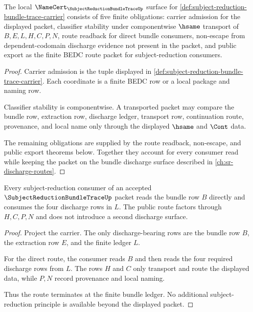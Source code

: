 \begin{theorem}
\label{thm:subject-reduction-bundle-trace-namecert-obligations}
The local $\NameCert_{\SubjectReductionBundleTraceUp}$ surface for
\autoref{def:subject-reduction-bundle-trace-carrier} consists of five finite
obligations: carrier admission for the displayed packet, classifier stability
under componentwise $\hsame$ transport of $B,E,L,H,C,P,N$, route readback for
direct bundle consumers, non-escape from dependent-codomain discharge evidence
not present in the packet, and public export as the finite BEDC route packet
for subject-reduction consumers.
\end{theorem}
\begin{proof}
Carrier admission is the tuple displayed in
\autoref{def:subject-reduction-bundle-trace-carrier}. Each coordinate is a
finite BEDC row or a local package and naming row.

Classifier stability is componentwise. A transported packet may compare the
bundle row, extraction row, discharge ledger, transport row, continuation
route, provenance, and local name only through the displayed $\hsame$ and
$\Cont$ data.

The remaining obligations are supplied by the route readback, non-escape, and
public export theorems below. Together they account for every consumer read
while keeping the packet on the bundle discharge surface described in
\autoref{ch:sr-discharge-routes}.
\end{proof}

\begin{theorem}
\label{thm:subject-reduction-bundle-trace-route-readback}
Every subject-reduction consumer of an accepted $\SubjectReductionBundleTraceUp$
packet reads the bundle row $B$ directly and consumes the four discharge rows
in $L$. The public route factors through $H,C,P,N$ and does not introduce a
second discharge surface.
\end{theorem}
\begin{proof}
Project the carrier. The only discharge-bearing rows are the bundle row $B$,
the extraction row $E$, and the finite ledger $L$.

For the direct route, the consumer reads $B$ and then reads the four required
discharge rows from $L$. The rows $H$ and $C$ only transport and route the
displayed data, while $P,N$ record provenance and local naming.

Thus the route terminates at the finite bundle ledger. No additional
subject-reduction principle is available beyond the displayed packet.
\end{proof}

